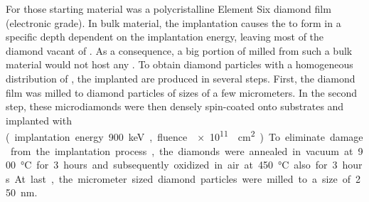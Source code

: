 	For those \nds starting material was a polycristalline Element Six diamond film (electronic grade).
	In bulk material, the implantation causes the \sivs to form in a specific depth dependent on the implantation energy, leaving most of the diamond vacant of \sivs.
	As a consequence, a big portion of  \nds milled from such a bulk material would not host any \sivs.
	To obtain diamond particles with a homogeneous distribution of \sivs, the implanted \nds are produced in several steps. 
	First, the diamond film was milled to diamond particles of sizes of a few micrometers.
	In the second step, these microdiamonds were then densely spin-coated onto \ir substrates and implanted with \si (implantation energy \SI{900}{keV}, fluence \SI{e11}{\per\centi\meter\squared}).
	To eliminate damage from the implantation process, the diamonds were annealed in vacuum at \SI{900}{\degreeCelsius} for 3 hours and subsequently oxidized in air at \SI{450}{\degreeCelsius} also for 3 hours.
	At last, the micrometer sized diamond particles were milled to a size of \SI{250}{\nano\meter}.